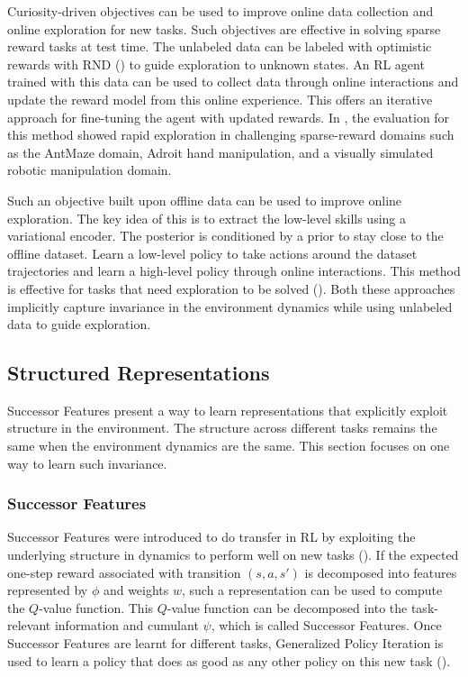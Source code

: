 \documentclass{article}
\begin{document}
Curiosity-driven objectives can be used to improve online data collection and online exploration for new tasks. Such objectives are effective in solving sparse reward tasks at test time. The unlabeled data can be labeled with optimistic rewards with  RND (\cite{burda2018exploration}) to guide exploration to unknown states. An RL agent trained with this data can be used to collect data through online interactions and update the reward model from this online experience. This offers an iterative approach for fine-tuning the agent with updated rewards. In \cite{li2023accelerating}, the evaluation for this method showed rapid exploration in challenging sparse-reward domains such as the AntMaze domain, Adroit hand manipulation, and a visually simulated robotic manipulation domain. 

Such an objective built upon offline data can be used to improve online exploration. The key idea of this is to extract the low-level skills using a variational encoder. The posterior is conditioned by a prior to stay close to the offline dataset. Learn a low-level policy to take actions around the dataset trajectories and learn a high-level policy through online interactions. This method is effective for tasks that need exploration to be solved (\cite{wilcoxson2024leveraging}). 
Both these approaches implicitly capture invariance in the environment dynamics while using unlabeled data to guide exploration.

\subsection{Structured Representations}
Successor Features present a way to learn representations that explicitly exploit structure in the environment. The structure across different tasks remains the same when the environment dynamics are the same. This section focuses on one way to learn such invariance. 

\subsubsection{Successor Features}
Successor Features were introduced to do transfer in RL by exploiting the underlying structure in dynamics to perform well on new tasks (\cite{barreto2017successor}). If the expected one-step reward associated with transition $(s, a, s')$ is decomposed into features represented by $\phi$ and weights $w$, such a representation can be used to compute the $Q$-value function. This $Q$-value function can be decomposed into the task-relevant information and cumulant $\psi$, which is called Successor Features. Once Successor Features are learnt for different tasks, Generalized Policy Iteration is used to learn a policy that does as good as any other policy on this new task (\cite{barreto2017successor}). 
\end{document}
